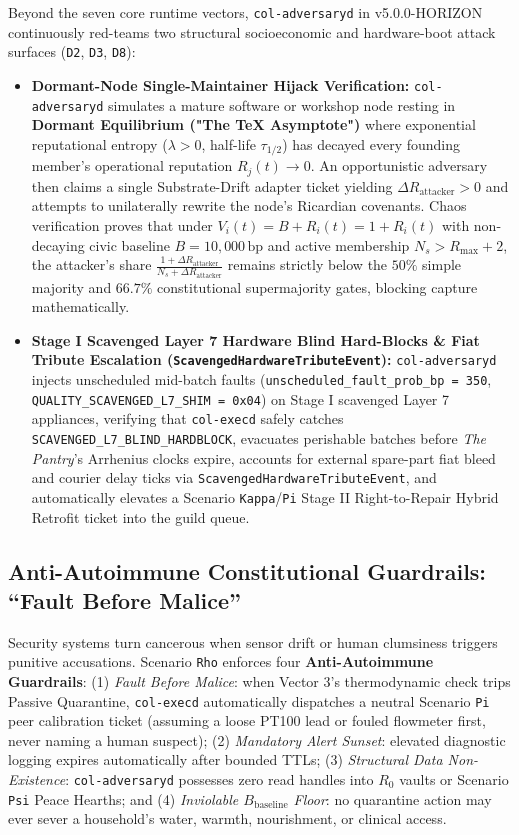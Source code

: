 Beyond the seven core runtime vectors, \texttt{col-adversaryd} in v5.0.0-HORIZON continuously red-teams two structural socioeconomic and hardware-boot
attack surfaces (\texttt{D2}, \texttt{D3}, \texttt{D8}):
\begin{itemize}
    \item \textbf{Dormant-Node Single-Maintainer Hijack Verification:} \texttt{col-adversaryd} simulates a mature software or workshop node resting in
    \textbf{Dormant Equilibrium ("The TeX Asymptote")} where exponential reputational entropy ($\lambda > 0$, half-life $\tau_{1/2}$) has decayed every
    founding member's operational reputation $R_j(t) \to 0$. An opportunistic adversary then claims a single Substrate-Drift adapter ticket yielding
    $\Delta R_{\mathrm{attacker}} > 0$ and attempts to unilaterally rewrite the node's Ricardian covenants. Chaos verification proves that under
    $V_i(t) = B + R_i(t) = 1 + R_i(t)$ with non-decaying civic baseline $B = 10{,}000\,\mathrm{bp}$ and active membership $N_s > R_{\max} + 2$, the
    attacker's share $\frac{1 + \Delta R_{\mathrm{attacker}}}{N_s + \Delta R_{\mathrm{attacker}}}$ remains strictly below the $50\%$ simple majority and
    $66.7\%$ constitutional supermajority gates, blocking capture mathematically.
    \item \textbf{Stage I Scavenged Layer 7 Hardware Blind Hard-Blocks \& Fiat Tribute Escalation (\texttt{ScavengedHardwareTributeEvent}):}
    \texttt{col-adversaryd} injects unscheduled mid-batch faults (\texttt{unscheduled\_fault\_prob\_bp = 350}, \texttt{QUALITY\_SCAVENGED\_L7\_SHIM = 0x04})
    on Stage I scavenged Layer 7 appliances, verifying that \texttt{col-execd} safely catches \texttt{SCAVENGED\_L7\_BLIND\_HARDBLOCK}, evacuates
    perishable batches before \textit{The Pantry}'s Arrhenius clocks expire, accounts for external spare-part fiat bleed and courier delay ticks via
    \texttt{ScavengedHardwareTributeEvent}, and automatically elevates a Scenario \texttt{Kappa}/\texttt{Pi} Stage II Right-to-Repair Hybrid Retrofit
    ticket into the guild queue.
\end{itemize}

\subsection{Anti-Autoimmune Constitutional Guardrails: ``Fault Before Malice''}

Security systems turn cancerous when sensor drift or human clumsiness triggers punitive accusations. Scenario \texttt{Rho} enforces four
\textbf{Anti-Autoimmune Guardrails}: (1) \emph{Fault Before Malice}: when Vector 3's thermodynamic check trips Passive Quarantine, \texttt{col-execd}
automatically dispatches a neutral Scenario \texttt{Pi} peer calibration ticket (assuming a loose PT100 lead or fouled flowmeter first, never naming a
human suspect); (2) \emph{Mandatory Alert Sunset}: elevated diagnostic logging expires automatically after bounded TTLs; (3) \emph{Structural Data
Non-Existence}: \texttt{col-adversaryd} possesses zero read handles into $R_0$ vaults or Scenario \texttt{Psi} Peace Hearths; and (4) \emph{Inviolable
$B_{\mathrm{baseline}}$ Floor}: no quarantine action may ever sever a household's water, warmth, nourishment, or clinical access.

